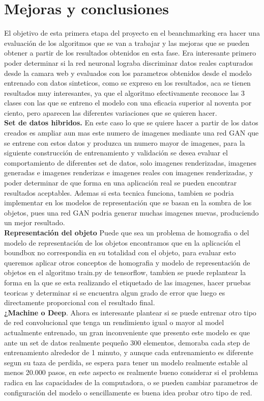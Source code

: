 \documentclass[conference]{IEEEtran}
\begin{document}
\section*{Mejoras y conclusiones}
El objetivo de esta primera etapa del proyecto en el beanchmarking era hacer una evaluaci\'on de los algoritmos que se van a trabajar  y las mejoras que se pueden obtener a partir de los resultados obtenidos en esta fase. Era interesante primero poder determinar si la red neuronal lograba discriminar datos reales capturados desde la camara web y evaluados con los parametros obtenidos desde el modelo entrenado con datos sinteticos, como se expreso en los resultados, aca se tienen resultados muy interesantes, ya que el algoritmo efectivamente reconoce las 3 clases con las que se entreno el modelo con una eficacia superior al noventa por ciento, pero aparecen las diferentes variaciones que se quieren hacer.\\
\subitem \textbf{Set de datos hibridos.}
En este caso lo que se quiere hacer a partir de los datos creados es ampliar aun mas este numero de imagenes mediante una red GAN que se entrene con estos datos y produzca un numero mayor de imagenes, para la siguiente construcci\'on de entrenamiento y validaci\'on se desea evaluar el comportamiento de diferentes set de datos, solo imagenes renderizadas, imagenes generadas e imagenes renderizas e imagenes reales con imagenes renderizadas, y poder determinar de que forma en una aplicaci\'on real se pueden encontrar resultados aceptables. Ademas si esta tecnica funciona, tambien se podria implementar en los modelos de representaci\'on que se basan en la sombra de los objetos, pues una red GAN podria generar muchas imagenes nuevas, produciendo un mejor resultado.\\
\subitem \textbf{Representaci\'on del objeto}
Puede que sea un problema de homografia o del modelo de representaci\'on de los objetos encontramos que en la aplicaci\'on el boundbox no correspondia en su totalidad con el objeto, para evaluar esto queremos aplicar otros conceptos de homografia y modelo de representaci\'on de objetos en el algoritmo train.py de tensorflow, tambien se puede replantear la forma en la que se esta realizando el etiquetado de las imagenes, hacer pruebas teoricas y determinar si se encuentra algun grado de error que luego es directamente proporcional con el resultado final.\\
\subitem \textbf{¿Machine o Deep}. 
Ahora es interesante plantear si se puede entrenar otro tipo de red convolucional que tenga un rendimiento igual o mayor al model actualmente entrenado, un gran inconveniente que presento este modelo es que ante un set de datos realmente pequeño 300 elementos, demoraba cada step de entrenamiento alrededor de 1 minuto, y aunque cada entrenamiento es diferente segun su taza de perdida, se espera para tener un modelo realmente estable al menos 20.000 pasos, en este aspecto es realmente bueno considerar si el problema radica en las capacidades de la computadora, o se pueden cambiar parametros de configuraci\'on del modelo o sencillamente es buena idea probar otro tipo de red.
\end{document}
